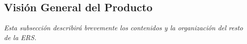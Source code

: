 \subsection{Visión General del Producto}
\par \emph{Esta  subsección  describirá  brevemente  los  contenidos  y  la  organización  del  resto de la ERS.}


